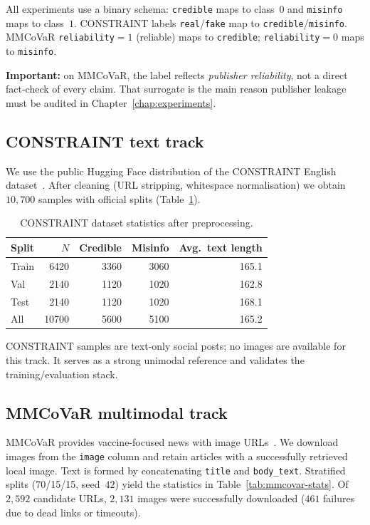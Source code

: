\documentclass[12pt, a4paper]{report}
\begin{document}
All experiments use a binary schema:
\texttt{credible} maps to class~$0$ and \texttt{misinfo} maps to class~$1$.
CONSTRAINT labels \texttt{real}/\texttt{fake} map to \texttt{credible}/\texttt{misinfo}.
MMCoVaR \texttt{reliability}$=1$ (reliable) maps to \texttt{credible}; \texttt{reliability}$=0$ maps to \texttt{misinfo}.

\textbf{Important:} on MMCoVaR, the label reflects \emph{publisher reliability}, not a direct fact-check of every claim.
That surrogate is the main reason publisher leakage must be audited in Chapter~\ref{chap:experiments}.

\subsection{CONSTRAINT text track}

We use the public Hugging Face distribution of the CONSTRAINT English dataset~\cite{patwa2021fighting}.
After cleaning (URL stripping, whitespace normalisation) we obtain $10{,}700$ samples with official splits (Table~\ref{tab:constraint-stats}).

\begin{table}[htbp]
\centering
\caption{CONSTRAINT dataset statistics after preprocessing.}
\label{tab:constraint-stats}
\begin{tabular}{lrrrr}
\hline
Split & $N$ & Credible & Misinfo & Avg.\ text length \\
\hline
Train & 6420 & 3360 & 3060 & 165.1 \\
Val   & 2140 & 1120 & 1020 & 162.8 \\
Test  & 2140 & 1120 & 1020 & 168.1 \\
\hline
All   & 10700 & 5600 & 5100 & 165.2 \\
\hline
\end{tabular}
\end{table}

CONSTRAINT samples are text-only social posts; no images are available for this track.
It serves as a strong unimodal reference and validates the training/evaluation stack.

\subsection{MMCoVaR multimodal track}

MMCoVaR provides vaccine-focused news with image URLs~\cite{chen2021mmcovar}.
We download images from the \texttt{image} column and retain articles with a successfully retrieved local image.
Text is formed by concatenating \texttt{title} and \texttt{body\_text}.
Stratified splits (70/15/15, seed~$42$) yield the statistics in Table~\ref{tab:mmcovar-stats}.
Of $2{,}592$ candidate URLs, $2{,}131$ images were successfully downloaded ($461$ failures due to dead links or timeouts).
\end{document}
